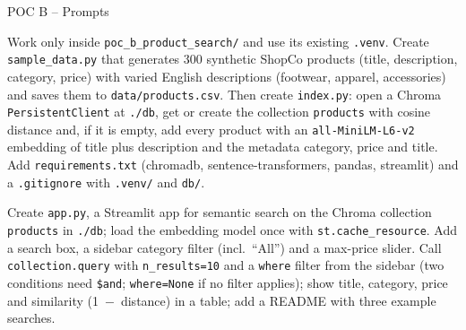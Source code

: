 \documentclass[aspectratio=169,11pt]{beamer}
\begin{document}
\begin{frame}{POC B -- Prompts}
  \vspace{-2pt}%
  \begin{promptbox}
    \raggedright\fontsize{9}{10.5}\selectfont Work only inside \texttt{poc\_b\_product\_search/} and use its existing \texttt{.venv}. Create \texttt{sample\_data.py} that generates 300 synthetic ShopCo products (title, description, category, price) with varied English descriptions (footwear, apparel, accessories) and saves them to \texttt{data/products.csv}. Then create \texttt{index.py}: open a Chroma \texttt{PersistentClient} at \texttt{./db}, get or create the collection \texttt{products} with cosine distance and, if it is empty, add every product with an \texttt{all-MiniLM-L6-v2} embedding of title plus description and the metadata category, price and title. Add \texttt{requirements.txt} (chromadb, sentence-transformers, pandas, streamlit) and a \texttt{.gitignore} with \texttt{.venv/} and \texttt{db/}.
  \end{promptbox}
  \vspace{-2pt}
  \begin{promptbox}
    \raggedright\fontsize{9}{10.5}\selectfont Create \texttt{app.py}, a Streamlit app for semantic search on the Chroma collection \texttt{products} in \texttt{./db}; load the embedding model once with \texttt{st.cache\_resource}. Add a search box, a sidebar category filter (incl.\ ``All'') and a max-price slider. Call \texttt{collection.query} with \texttt{n\_results=10} and a \texttt{where} filter from the sidebar (two conditions need \texttt{\$and}; \texttt{where=None} if no filter applies); show title, category, price and similarity (1~$-$~distance) in a table; add a README with three example searches.
  \end{promptbox}
\end{frame}
\end{document}
